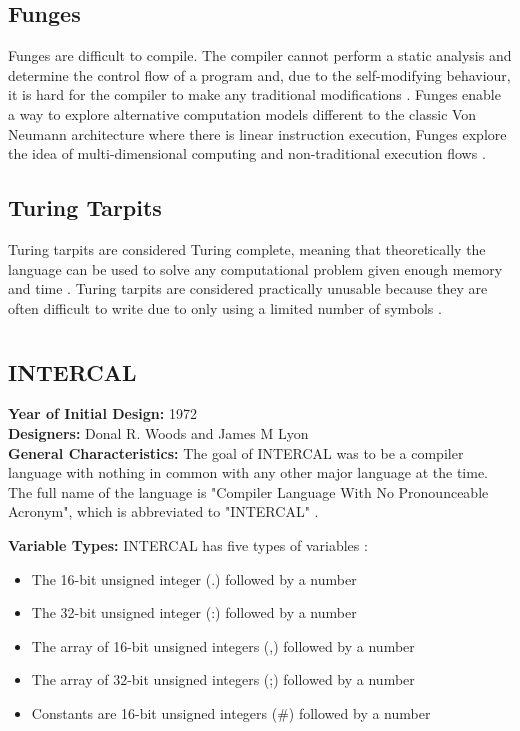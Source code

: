 \documentclass{article}
\begin{document}
\subsection{Funges}
Funges are difficult to compile. The compiler cannot perform a static analysis and determine the control flow of a program and, due to the self-modifying behaviour, it is hard for the compiler to make any traditional modifications \cite{Oak, Ohms}.
Funges enable a way to explore alternative computation models different to the classic Von Neumann architecture where there is linear instruction execution, Funges explore the idea of multi-dimensional computing and non-traditional execution flows \cite{Morr}.
\subsection{Turing Tarpits}
Turing tarpits are considered Turing complete, meaning that theoretically the language can be used to solve any computational problem given enough memory and time \cite{Harrison}. Turing tarpits are considered practically unusable because they are often difficult to write due to only using a limited number of symbols \cite{Tomassetti}.

\section{}
\subsection{INTERCAL}
\textbf{Year of Initial Design:} 1972\\
\textbf{Designers:} Donal R. Woods and James M Lyon\\

\textbf{General Characteristics:}
The goal of INTERCAL was to be a compiler language with nothing in common with any other major language at the time. The full name of the language is "Compiler Language With No Pronounceable Acronym", which is abbreviated to "INTERCAL" \cite{Woods}. 

\textbf{Variable Types:}
INTERCAL has five types of variables \cite{EsolangsINTERCAL}:
\begin{itemize}
    \item The 16-bit unsigned integer (.) followed by a number
\end{itemize}
\begin{itemize}
    \item The 32-bit unsigned integer (:) followed by a number
\end{itemize}
\begin{itemize}
    \item The array of 16-bit unsigned integers (,) followed by a number
\end{itemize}
\begin{itemize}
    \item The array of 32-bit unsigned integers (;) followed by a number
\end{itemize}
\begin{itemize}
    \item Constants are 16-bit unsigned integers (#) followed by a number
\end{itemize}
\end{document}
